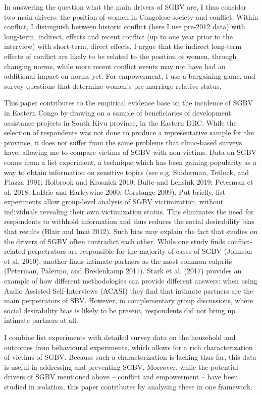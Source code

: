 \documentclass[
]{article}
\begin{document}
In answering the question what the main drivers of SGBV are, I thus
consider two main drivers: the position of women in Congolese society
and conflict. Within conflict, I distinguish between historic conflict
(here I use pre-2012 data) with long-term, indirect, effects and recent
conflict (up to one year prior to the interview) with short-term, direct
effects. I argue that the indirect long-term effects of conflict are
likely to be related to the position of women, through changing norms,
while more recent conflict events may not have had an additional impact
on norms yet. For empowerment, I use a bargaining game, and survey
questions that determine women's pre-marriage relative status.

This paper contributes to the empirical evidence base on the incidence
of SGBV in Eastern Congo by drawing on a sample of beneficiaries of
development assistance projects in South Kivu province, in the Eastern
DRC. While the selection of respondents was not done to produce a
representative sample for the province, it does not suffer from the same
problems that clinic-based surveys have, allowing me to compare victims
of SGBV with non-victims. Data on SGBV comes from a list experiment, a
technique which has been gaining popularity as a way to obtain
information on sensitive topics (see e.g. Sniderman, Tetlock, and Piazza
1991; Holbrook and Krosnick 2010; Bulte and Lensink 2019; Peterman et
al. 2018; LaBrie and Earleywine 2000; Corstange 2009). Put briefly, list
experiments allow group-level analysis of SGBV victimization, without
individuals revealing their own victimization status. This eliminates
the need for respondents to withhold information and thus reduces the
social desirability bias that results (Blair and Imai 2012). Such bias
may explain the fact that studies on the drivers of SGBV often
contradict each other. While one study finds conflict-related
perpetrators are responsible for the majority of cases of SGBV (Johnson
et al. 2010), another finds intimate partners as the most common
culprits (Peterman, Palermo, and Bredenkamp 2011). Stark et al. (2017)
provides an example of how different methodologies can provide different
answers: when using Audio Assisted Self-Interviews (ACASI) they find
that intimate partners are the main perpetrators of SBV. However, in
complementary group discussions, where social desirability bias is
likely to be present, respondents did not bring up intimate partners at
all.

I combine list experiments with detailed survey data on the household
and outcomes from behavioural experiments, which allows for a rich
characterization of victims of SGBV. Because such a characterization is
lacking thus far, this data is useful in addressing and preventing SGBV.
Moreover, while the potential drivers of SGBV mentioned above --
conflict and empowerment -- have been studied in isolation, this paper
contributes by analysing these in one framework.
\end{document}
